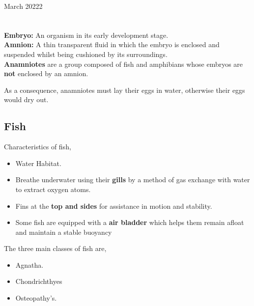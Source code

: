 \documentclass[12pt,oneside]{book} %
\begin{document}
	\renewcommand*{\term}{Term 2} %
	\renewcommand*{\coursecode}{MCR3U} %
	\renewcommand*{\coursename}{Course Name} %
	\renewcommand*{\thelecnum}{4} %
	\renewcommand*{\profname}{Prof Name} %
	\renewcommand*{\colink}{http://www.student.math.uwaterloo.ca/~c2kent} %
	\clearpage
	\pagestyle{classlecture}
\begin{lec}{March 20222}
	\chapter{\chapname\chaplec}

  \textbf{Embryo:} An organism in its early development stage.\\
  
  \textbf{Amnion:} A thin transparent fluid in which the embryo is enclosed and suspended whilst being cushioned by its
  surroundings.\\

  \textbf{Anamniotes} are a group composed of fish and amphibians whose embryos are \textbf{not} enclosed by an amnion.

  As a consequence, anamniotes must lay their eggs in water, otherwise their eggs would dry out.\\

  \section{Fish}
  Characteristics of fish,
  \begin{itemize}
    \item Water Habitat.
    \item Breathe underwater using their \textbf{gills} by a method of gas exchange with water to extract oxygen atoms.
    \item Fins at the \textbf{top and sides} for assistance in motion and stability.
    \item Some fish are equipped with a \textbf{air bladder} which helps them remain afloat and maintain a stable buoyancy 
  \end{itemize}
  The three main classes of fish are,
  \begin{itemize}
    \item Agnatha.
    \item Chondrichthyes
    \item Osteopathy's.
  \end{itemize}


\end{lec}
\end{document}

